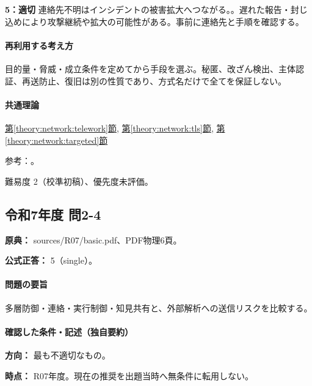 \noindent\textbf{5：適切} 連絡先不明はインシデントの被害拡大へつながる。。遅れた報告・封じ込めにより攻撃継続や拡大の可能性がある。事前に連絡先と手順を確認する。\par

\paragraph{再利用する考え方} 目的量・脅威・成立条件を定めてから手段を選ぶ。秘匿、改ざん検出、主体認証、再送防止、復旧は別の性質であり、方式名だけで全てを保証しない。

\paragraph{共通理論} \hyperref[theory:network:telework]{第\ref*{theory:network:telework}節}, \hyperref[theory:network:tls]{第\ref*{theory:network:tls}節}, \hyperref[theory:network:targeted]{第\ref*{theory:network:targeted}節}

\par 参考：\cite{net_meeting2020,net_telework}。

\par 難易度 2（校準初稿）、優先度未評価。

\subsection{令和7年度 問2-4}
\label{q:r07-reg-basic-2-4}

\noindent\textbf{原典：} sources/R07/basic.pdf、PDF物理6頁。

\textbf{公式正答：} 5（single）。

\paragraph{問題の要旨} 多層防御・連絡・実行制御・知見共有と、外部解析への送信リスクを比較する。

\paragraph{確認した条件・記述（独自要約）}\mbox{}\par

\noindent\textbf{方向：} 最も不適切なもの。\par

\noindent\textbf{時点：} R07年度。現在の推奨を出題当時へ無条件に転用しない。\par

